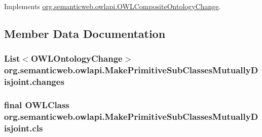 Implements \hyperlink{interfaceorg_1_1semanticweb_1_1owlapi_1_1_o_w_l_composite_ontology_change_a047d3f540ac840c0ac0285bc576636d2}{org.\-semanticweb.\-owlapi.\-O\-W\-L\-Composite\-Ontology\-Change}.



\subsection{Member Data Documentation}
\hypertarget{classorg_1_1semanticweb_1_1owlapi_1_1_make_primitive_sub_classes_mutually_disjoint_aa32b9797f2b492facc23a6819dc30213}{
\subsubsection[{changes}]{\setlength{\rightskip}{0pt plus 5cm}List$<${\bf O\-W\-L\-Ontology\-Change}$>$ org.\-semanticweb.\-owlapi.\-Make\-Primitive\-Sub\-Classes\-Mutually\-Disjoint.\-changes\hspace{0.3cm}{\ttfamily [private]}}}\label{classorg_1_1semanticweb_1_1owlapi_1_1_make_primitive_sub_classes_mutually_disjoint_aa32b9797f2b492facc23a6819dc30213}
\hypertarget{classorg_1_1semanticweb_1_1owlapi_1_1_make_primitive_sub_classes_mutually_disjoint_ac3410194653892673d57bdf45b537496}{
\subsubsection[{cls}]{\setlength{\rightskip}{0pt plus 5cm}final {\bf O\-W\-L\-Class} org.\-semanticweb.\-owlapi.\-Make\-Primitive\-Sub\-Classes\-Mutually\-Disjoint.\-cls\hspace{0.3cm}{\ttfamily [private]}}}\label{classorg_1_1semanticweb_1_1owlapi_1_1_make_primitive_sub_classes_mutually_disjoint_ac3410194653892673d57bdf45b537496}
